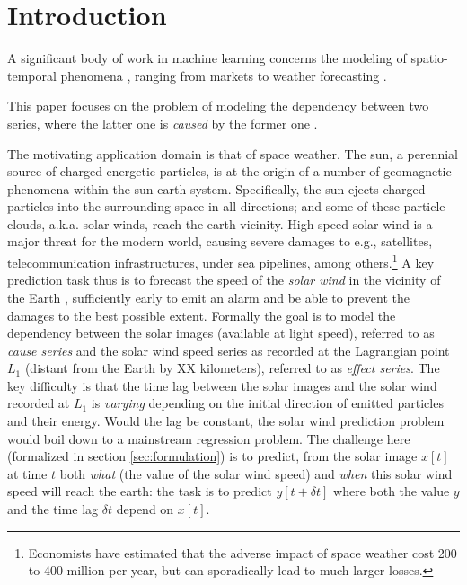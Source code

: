 \section{Introduction}
A significant body of work in machine learning concerns the modeling of spatio-temporal phenomena \cite{SurveyST}, 
ranging from markets \cite{Pedreschi} to weather forecasting \cite{Horvitz}.

This paper focuses on the problem of modeling the dependency between two series, 
where the latter one is {\em caused} by the former one \cite{Granger}. 

The motivating application domain is that of space weather.
The sun, a perennial source of charged energetic particles, is at the origin of a number of geomagnetic phenomena within the sun-earth system. 
Specifically, the sun ejects charged particles into the surrounding space in all directions; and some of these particle clouds, a.k.a. solar winds, reach the earth vicinity. High speed solar wind is a major threat for the modern world, causing severe damages to e.g., satellites, telecommunication infrastructures, under sea pipelines, among others.\footnote{Economists have estimated that the adverse impact of space weather cost 200 to 400 million per year, but can sporadically lead to much larger losses.} 
A key prediction task thus is to forecast the speed of the \emph{solar wind} in 
the vicinity of the Earth \cite{doi:10.1002/jgra.50429,doi:10.1029/2009SW000542}, sufficiently early to emit an alarm and be able to prevent the damages to the best possible extent.
Formally the goal is to model the dependency between the solar images (available at light speed), referred to as {\em cause series} 
and the solar wind speed series as recorded at the Lagrangian point $L_1$ (distant from the Earth by XX kilometers), referred to as {\em effect series}. 
The key difficulty is that the time lag between the solar images and the solar wind recorded at $L_1$ is {\em varying} depending on the initial direction of emitted particles and their energy. Would the lag be constant, the solar wind prediction problem would boil down to a mainstream regression problem. The challenge here (formalized in section \ref{sec:formulation})
is to predict, from the solar image $x[t]$ at time $t$ both {\em what} (the value of the solar wind speed) and {\em when} this solar wind speed will reach the earth: the task is to predict $y[t + \delta t]$ where both the value $y$ and the time lag $\delta t$ depend on $x[t]$. 



